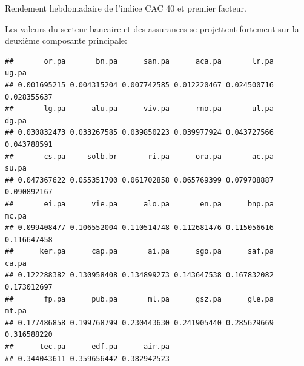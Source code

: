 \documentclass[
]{article}
\newenvironment{Shaded}{\begin{snugshade}}{\end{snugshade}}
\newcommand{\DecValTok}[1]{\textcolor[rgb]{0.00,0.00,0.81}{#1}}
\newcommand{\FunctionTok}[1]{\textcolor[rgb]{0.00,0.00,0.00}{#1}}
\newcommand{\NormalTok}[1]{#1}
\newcommand{\SpecialCharTok}[1]{\textcolor[rgb]{0.00,0.00,0.00}{#1}}
\begin{document}
Rendement hebdomadaire de l'indice CAC 40 et premier facteur.

Les valeurs du secteur bancaire et des assurances se projettent
fortement sur la deuxième composante principale:

\begin{Shaded}
\end{Shaded}

\begin{verbatim}
##       or.pa       bn.pa      san.pa      aca.pa       lr.pa       ug.pa 
## 0.001695215 0.004315204 0.007742585 0.012220467 0.024500716 0.028355637 
##       lg.pa      alu.pa      viv.pa      rno.pa       ul.pa       dg.pa 
## 0.030832473 0.033267585 0.039850223 0.039977924 0.043727566 0.043788591 
##       cs.pa     solb.br       ri.pa      ora.pa       ac.pa       su.pa 
## 0.047367622 0.055351700 0.061702858 0.065769399 0.079708887 0.090892167 
##       ei.pa      vie.pa      alo.pa       en.pa      bnp.pa       mc.pa 
## 0.099408477 0.106552004 0.110514748 0.112681476 0.115056616 0.116647458 
##      ker.pa      cap.pa       ai.pa      sgo.pa      saf.pa       ca.pa 
## 0.122288382 0.130958408 0.134899273 0.143647538 0.167832082 0.173012697 
##       fp.pa      pub.pa       ml.pa      gsz.pa      gle.pa       mt.pa 
## 0.177486858 0.199768799 0.230443630 0.241905440 0.285629669 0.316588220 
##      tec.pa      edf.pa      air.pa 
## 0.344043611 0.359656442 0.382942523
\end{verbatim}

\begin{Shaded}
\end{Shaded}
\end{document}
